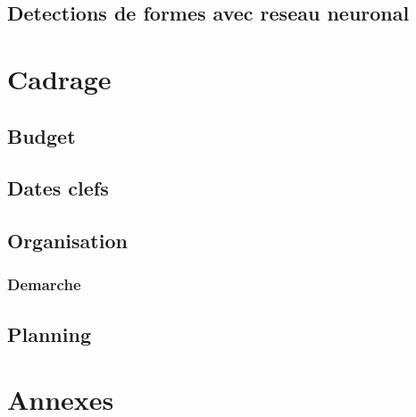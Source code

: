 \documentclass[a4paper, 12pt, titlepage, oneside]{article}
\begin{document}
	\subsection{Detections de formes avec reseau neuronal}
	\newpage
\section{Cadrage}
	\subsection{Budget}
	\subsection{Dates clefs}
	\subsection{Organisation}
	\subsubsection{Demarche}
	\subsection{Planning}
	\newpage
\section{Annexes}
\end{document}
